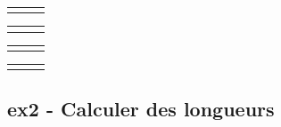 \documentclass[12pt]{article}
\begin{document}
\begin{multicols}{4}

  \begin{center}
    \begin{tabular}{|c|c|c|}
      \hline
      \phantom{azer} &  \phantom{azer} &  \phantom{azer} \\  \hline
      &  & \\  \hline
    \end{tabular}
  \end{center}

  \begin{center}
    \begin{tabular}{|c|c|c|}
      \hline
      \phantom{azer} &  \phantom{azer} &  \phantom{azer} \\  \hline
      &  & \\  \hline
    \end{tabular}
  \end{center}

  \begin{center}
    \begin{tabular}{|c|c|c|}
      \hline
      \phantom{azer} &  \phantom{azer} &  \phantom{azer} \\  \hline
      &  & \\  \hline
    \end{tabular}
  \end{center}


  \begin{center}
    \begin{tabular}{|c|c|c|}
      \hline
      \phantom{azer} &  \phantom{azer} &  \phantom{azer} \\  \hline
      &  & \\  \hline
    \end{tabular}
  \end{center}

\end{multicols}


\subsection*{ex2 - Calculer des longueurs}
\end{document}
